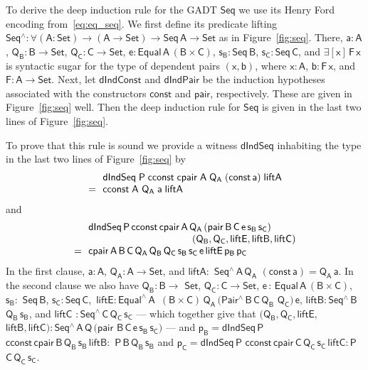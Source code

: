 \documentclass[sigplan,10pt,anonymous,review]{acmart}
\begin{document}
To derive the deep induction rule for the GADT $\mathsf{Seq}$ we use
its Henry Ford encoding from~\eqref{eq:eq_seq}.  We first define its
predicate lifting $\mathsf{Seq^\wedge : \forall (A : Set) \to (A \to
  Set) \to Seq\,A \to Set}$ as in Figure~\ref{fig:seq}. There,
$\mathsf{a : A}$, $\mathsf{Q_B : B \to Set}$, $\mathsf{Q_C : C \to
  Set}$, $\mathsf{e : Equal\,A\,(B \times C)}$, $\mathsf{s_B :
  Seq\,B}$, $\mathsf{s_C : Seq\,C}$, and $\mathsf{\exists [x]\, F
  \,x}$ is syntactic sugar for the type of dependent pairs
$\mathsf{(x,b)}$, where $\mathsf{x : A}$, $\mathsf{b : F\, x}$, and
$\mathsf{F : A \to Set}$. Next, let $\mathsf{dIndConst}$ and
$\mathsf{dIndPair}$ be the induction hypotheses associated with the
constructors $\mathsf{const}$ and $\mathsf{pair}$, respectively. These
are given in Figure~\ref{fig:seq} well. Then the deep induction rule
for $\mathsf{Seq}$ is given in the last two lines of
Figure~\ref{fig:seq}.

To prove that this rule is sound we provide a witness
$\mathsf{dIndSeq}$ inhabiting the type in the last two lines of
Figure~\ref{fig:seq} by
\[\begin{array}{ll}
& \!\!\mathsf{dIndSeq\;P\;cconst\;cpair\;A\;Q_A\;(const\,a)\;liftA}\\
= & \!\!\mathsf{cconst\;A}$ $\mathsf{Q_A\;a\;liftA}
\end{array}\]
and
\[\begin{array}{ll}
 &\!\!\mathsf{dIndSeq\,P\,cconst\,cpair\,A\,Q_A\,(pair\,B\,C\,e\,s_B\,s_C)}\\
 & \hspace*{1.4in}\mathsf{(Q_B, Q_C, liftE, liftB, liftC)}\\
= &\!\! \mathsf{cpair\,A\,B\,C\,Q_A\,Q_B\,Q_C\,s_B\,s_C\,e\,liftE\,
  p_B\,p_C}
\end{array}\]
In the first clause, $\mathsf{a : A}$, $\mathsf{Q_A : A
  \to Set}$, and $\mathsf{liftA :}$
$\mathsf{Seq^{\wedge}\,A\,Q_A}$ $\mathsf{(const\,a) = Q_A\,a}$. In the second
clause we also have $\mathsf{Q_B : B \to}$ $\mathsf{Set}$, $\mathsf{Q_C : C \to
  Set}$, $\mathsf{e \,:\, Equal\,A\,(B \times C)}$,\, $\mathsf{s_B :}$
$\mathsf{Seq\,B}$, $\mathsf{s_C : Seq\,C}$,\, $\mathsf{liftE :
  Equal^{\wedge}\,A\,}$ $\mathsf{(B \times C)\, Q_A\, (Pair^\wedge
  \,B\,C\,Q_B}$ $\mathsf{Q_C) \, e}$, $\mathsf{liftB :
  Seq^{\wedge}\,B}$ $\mathsf{Q_B\,s_B}$, and $\mathsf{liftC}$ $\mathsf{ :
  Seq^{\wedge}\,C\,Q_C\,s_C}$ --- which together give that
$\mathsf{(Q_B, Q_C, liftE,}$ $\mathsf{liftB, liftC) :
  Seq^{\wedge}\,A\,Q\,(pair}$ $\mathsf{B\,C\,e\,s_B\,s_C)}$ --- and
$\mathsf{p_B} = \mathsf{dIndSeq\,P}$
$\mathsf{cconst\,cpair\,B\,Q_B\,s_B\,liftB :}$
$\mathsf{P\,B\,Q_B\,s_B}$ and $\mathsf{p_C} =\mathsf{dIndSeq\,P}$
$\mathsf{cconst\,cpair\,C\,Q_C\,s_C\,liftC : P}$
$\mathsf{C\,Q_C\,s_C}$.
\end{document}
